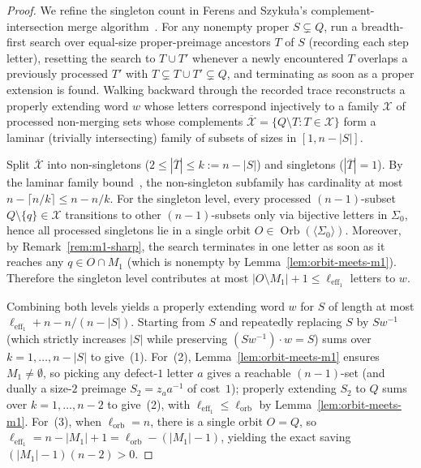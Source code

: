 \documentclass[11pt,a4paper]{article}
\theoremstyle{definition}
\theoremstyle{remark}
\newcommand{\Orb}{\operatorname{Orb}}
\newcommand{\leff}{\ell_{\mathrm{eff}_1}}
\newcommand{\lorb}{\ell_{\mathrm{orb}}}
\begin{document}
\begin{proof}
We refine the singleton count in Ferens and Szyku\l a's complement-intersection merge algorithm~\cite{FS2025}. For any nonempty proper $S \subsetneq Q$, run a breadth-first search over equal-size proper-preimage ancestors $T$ of $S$ (recording each step letter), resetting the search to $T \cup T'$ whenever a newly encountered $T$ overlaps a previously processed $T'$ with $T \subsetneq T \cup T' \subsetneq Q$, and terminating as soon as a proper extension is found. Walking backward through the recorded trace reconstructs a properly extending word $w$ whose letters correspond injectively to a family $\mathcal{X}$ of processed non-merging sets whose complements $\overline{\mathcal{X}} = \{Q \setminus T : T \in \mathcal{X}\}$ form a laminar (trivially intersecting) family of subsets of sizes in $[1, n - |S|]$.

Split $\overline{\mathcal{X}}$ into non-singletons ($2 \le |\overline{T}| \le k := n - |S|$) and singletons ($|\overline{T}| = 1$). By the laminar family bound~\cite{FS2025}, the non-singleton subfamily has cardinality at most $n - \lceil n / k \rceil \le n - n / k$. For the singleton level, every processed $(n - 1)$-subset $Q \setminus \{q\} \in \mathcal{X}$ transitions to other $(n - 1)$-subsets only via bijective letters in $\Sigma_0$, hence all processed singletons lie in a single orbit $O \in \Orb(\langle \Sigma_0 \rangle)$. Moreover, by Remark~\ref{rem:m1-sharp}, the search terminates in one letter as soon as it reaches any $q \in O \cap M_1$ (which is nonempty by Lemma~\ref{lem:orbit-meets-m1}). Therefore the singleton level contributes at most $|O \setminus M_1| + 1 \le \leff$ letters to $w$.

Combining both levels yields a properly extending word $w$ for $S$ of length at most $\leff + n - n / (n - |S|)$. Starting from $S$ and repeatedly replacing $S$ by $S w^{-1}$ (which strictly increases $|S|$ while preserving $(S w^{-1}) \cdot w = S$) sums over $k = 1, \dots, n - |S|$ to give~(1). For~(2), Lemma~\ref{lem:orbit-meets-m1} ensures $M_1 \neq \emptyset$, so picking any defect-$1$ letter $a$ gives a reachable $(n - 1)$-set (and dually a size-$2$ preimage $S_2 = z_a a^{-1}$ of cost~$1$); properly extending $S_2$ to $Q$ sums over $k = 1, \dots, n - 2$ to give~(2), with $\leff \le \lorb$ by Lemma~\ref{lem:orbit-meets-m1}. For~(3), when $\lorb = n$, there is a single orbit $O = Q$, so $\leff = n - |M_1| + 1 = \lorb - (|M_1| - 1)$, yielding the exact saving $(|M_1| - 1)(n - 2) > 0$.
\end{proof}
\end{document}
